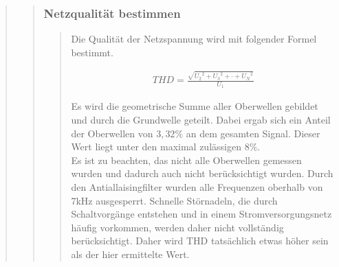 \begin{quote}
\begin{quote}
        \subsubsection{Netzqualität bestimmen}
    	\begin{quote}
    		Die Qualität der Netzspannung wird mit folgender Formel bestimmt.
    		
    		\begin{align}
                THD = \frac{\sqrt{{U_2}^2+{U_3}^2+ \cdot + {U_N}^2}}{U_1}
            \end{align}
            
            Es wird die geometrische Summe aller Oberwellen gebildet und durch die Grundwelle geteilt.
            Dabei ergab sich ein Anteil der Oberwellen von $3,32\%$ an dem gesamten Signal. Dieser Wert liegt unter den
            maximal zulässigen $8\%$.\\
            Es ist zu beachten, das nicht alle Oberwellen gemessen wurden und dadurch auch nicht berücksichtigt wurden.
            Durch den Antiallaisingfilter wurden alle Frequenzen oberhalb von 7kHz ausgesperrt. Schnelle Störnadeln, die
            durch Schaltvorgänge entstehen und in einem Stromversorgungsnetz häufig vorkommen, werden daher nicht
            vollständig berücksichtigt. Daher wird THD tatsächlich etwas höher sein als der hier ermittelte Wert.
            

\end{quote}
\end{quote}
\end{quote}
